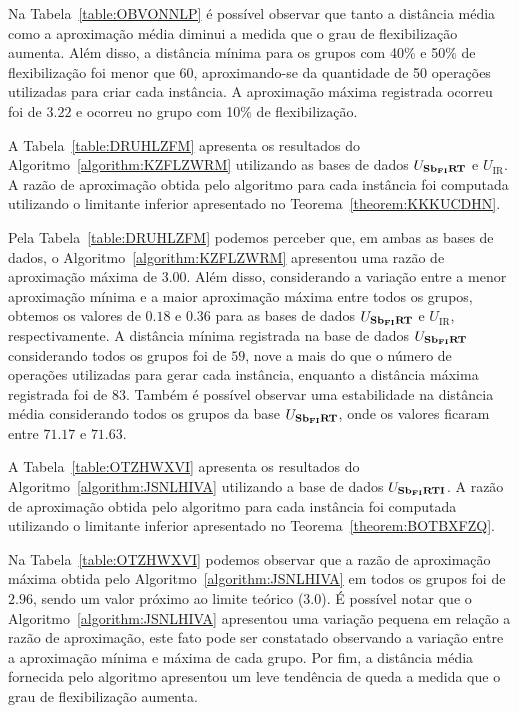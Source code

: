 Na Tabela~\ref{table:OBVONNLP} é possível observar que tanto a distância média como a aproximação média diminui a medida que o grau de flexibilização aumenta. Além disso, a distância mínima para os grupos com 40\% e 50\% de flexibilização foi menor que 60, aproximando-se da quantidade de 50 operações utilizadas para criar cada instância. A aproximação máxima registrada ocorreu foi de $3.22$ e ocorreu no grupo com 10\% de flexibilização.

A Tabela~\ref{table:DRUHLZFM} apresenta os resultados do Algoritmo~\ref{algorithm:KZFLZWRM} utilizando as bases de dados $U_{\textbf{Sb\textsubscript{FI}RT}}{}$ e $U_{\text{IR}}$. A razão de aproximação obtida pelo algoritmo para cada instância foi computada utilizando o limitante inferior apresentado no Teorema~\ref{theorem:KKKUCDHN}.



% 

Pela Tabela~\ref{table:DRUHLZFM} podemos perceber que, em ambas as bases de dados, o Algoritmo~\ref{algorithm:KZFLZWRM} apresentou uma razão de aproximação máxima de $3.00$. Além disso, considerando a variação entre a menor aproximação mínima e a maior aproximação máxima entre todos os grupos, obtemos os valores de $0.18$ e $0.36$ para as bases de dados $U_{\textbf{Sb\textsubscript{FI}RT}}{}$ e $U_{\text{IR}}$, respectivamente. A distância mínima registrada na base de dados $U_{\textbf{Sb\textsubscript{FI}RT}}{}$ considerando todos os grupos foi de $59$, nove a mais do que o número de operações utilizadas para gerar cada instância, enquanto a distância máxima registrada foi de $83$. Também é possível observar uma estabilidade na distância média considerando todos os grupos da base $U_{\textbf{Sb\textsubscript{FI}RT}}{}$, onde os valores ficaram entre $71.17$ e $71.63$.

A Tabela~\ref{table:OTZHWXVI} apresenta os resultados do Algoritmo~\ref{algorithm:JSNLHIVA} utilizando a base de dados $U_{\textbf{Sb\textsubscript{FI}RTI}}{}$. A razão de aproximação obtida pelo algoritmo para cada instância foi computada utilizando o limitante inferior apresentado no Teorema~\ref{theorem:BOTBXFZQ}.



Na Tabela~\ref{table:OTZHWXVI} podemos observar que a razão de aproximação máxima obtida pelo Algoritmo~\ref{algorithm:JSNLHIVA} em todos os grupos foi de $2.96$, sendo um valor próximo ao limite teórico ($3.0$). É possível notar que o Algoritmo~\ref{algorithm:JSNLHIVA} apresentou uma variação pequena em relação a razão de aproximação, este fato pode ser constatado observando a variação entre a aproximação mínima e máxima de cada grupo. Por fim, a distância média fornecida pelo algoritmo apresentou um leve tendência de queda a medida que o grau de flexibilização aumenta.

